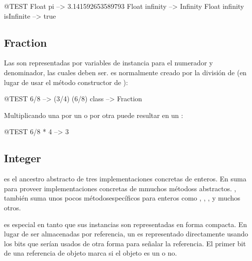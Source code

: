 \documentclass[a4paper,10pt,twoside]{book}
\begin{document}
\begin{code}{@TEST}
Float pi                      --> 3.141592653589793
Float infinity               --> Infinity
Float infinity isInfinite --> true
\end{code}

\subsection{Fraction}

Las  son representadas por variables de instancia para el numerador y denominador, las cuales deben ser.  es normalmente creado por la divisi\'on de   (en lugar de usar el m\'etodo constructor de ):

\begin{code}{@TEST}
6/8             --> (3/4)
(6/8) class --> Fraction
\end{code}

Multiplicando una  por un  o por otra  puede resultar en un :

\begin{code}{@TEST}
6/8 * 4 --> 3
\end{code}



\subsection{Integer}

 es el ancestro abstracto de tres implementaciones concretas de enteros. En suma para proveer implementaciones concretas de mmuchos m\'etodoss abstractos. , tambi\'en suma unos pocos m\'etodosespec\'ificos para enteros como , , ,  y muchos otros.

 es especial en tanto que sus instancias son representadas en forma compacta. En lugar de ser almacenadas por referencia, un  es representado directamente usando los bits que ser\'ian usados de otra forma para señalar la referencia. El primer bit de una referencia de objeto marca si el objeto es un  o no.
\end{document}

